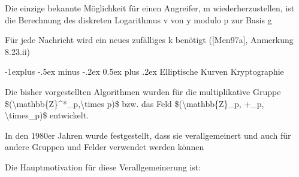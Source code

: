 \documentclass[a4paper]{article}
\makeatletter
\renewcommand{\subsection}{\@startsection{subsection}{2}{0mm}%
 {-1explus -.5ex minus -.2ex}%
 {0.5ex plus .2ex}%
 {\normalfont\normalsize\bfseries}}
\makeatother
\begin{document}
\begin{multicols}{3}
\begin{itemize*}
            \begin{itemize*}
                  \item Die einzige bekannte Möglichkeit für einen Angreifer, m wiederherzustellen, ist die Berechnung des diskreten Logarithmus v von y modulo p zur Basis g
                  \item Für jede Nachricht wird ein neues zufälliges k benötigt ({[}Men97a{]}, Anmerkung 8.23.ii)
            \end{itemize*}
      \end{itemize*}


      \subsection{Elliptische Kurven
            Kryptographie}

      \begin{itemize*}
            \item
            Die bisher vorgestellten Algorithmen wurden für die multiplikative
            Gruppe \$(\textbackslash mathbb\{Z\}\^{}*\_p,\textbackslash times p)\$
            bzw. das Feld \$(\textbackslash mathbb\{Z\}\_p, +\_p,
            \textbackslash times\_p)\$ entwickelt.
            \item
            In den 1980er Jahren wurde festgestellt, dass sie verallgemeinert und
            auch für andere Gruppen und Felder verwendet werden können
            \item
            Die Hauptmotivation für diese Verallgemeinerung ist:


\end{itemize*}
\end{multicols}
\end{document}
